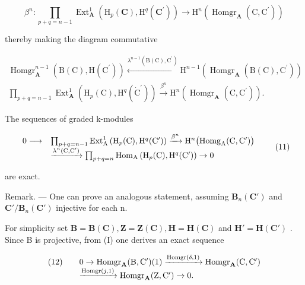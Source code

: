 \[
\beta^ {n}: \prod_ {p + q = n - 1} \operatorname{Ext} _ {\mathbf {A}} ^ {1} \left(\mathrm{H} _ {p} (\mathbf {C}), \mathrm{H} ^ {q} \left(\mathbf {C} ^ {\prime}\right)\right)\rightarrow \mathrm{H} ^ {n} \left(\operatorname{Homgr} _ {\mathbf {A}} \left(\mathrm{C}, \mathrm{C} ^ {\prime}\right)\right)
\]

thereby making the diagram commutative

\[
\begin{array}{c} \operatorname{Homgr} _ {\mathbf {A}} ^ {n - 1} (\mathrm{B} (\mathrm{C}), \mathrm{H} (\mathrm{C} ^ {\prime})) \xleftarrow {\lambda^ {n - 1} (\mathrm{B} (\mathrm{C}) , \mathrm{C} ^ {\prime})} \mathrm{H} ^ {n - 1} (\operatorname{Homgr} _ {\mathbf {A}} (\mathrm{B} (\mathrm{C}), \mathrm{C} ^ {\prime})) \\ \prod_ {p + q = n - 1} \operatorname{Ext} _ {\mathbf {A}} ^ {1} (\mathrm{H} _ {p} (\mathrm{C}), \mathrm{H} ^ {q} (\dot {\mathrm{C}} ^ {\prime})) \xrightarrow {\beta^ {n}} \mathrm{H} ^ {n} (\operatorname{Homgr} _ {\mathbf {A}} (\mathrm{C}, \mathrm{C} ^ {\prime})). \end{array}
\]

The sequences of graded k-modules

\[
\begin{array}{r l} 0 \longrightarrow & \prod_ {p + q = n - 1} \operatorname{Ext} _ {\mathrm{A}} ^ {1} \left(\mathrm{H} _ {p} (\mathrm{C}), \mathrm{H} ^ {q} (\mathrm{C} ^ {\prime})\right) \xrightarrow {\beta^ {n}} \mathrm{H} ^ {n} \big (\mathrm{Homg} _ {\mathrm{A}} (\mathrm{C}, \mathrm{C} ^ {\prime}) \big) \\ & \xrightarrow {\lambda^ {n} (\mathrm{C} , \mathrm{C} ^ {\prime})} \prod_ {p + q = n} \mathrm{Hom} _ {\mathrm{A}} \left(\mathrm{H} _ {p} (\mathrm{C}), \mathrm{H} ^ {q} (\mathrm{C} ^ {\prime})\right) \to 0 \end{array}\tag{11}
\]

are exact.

Remark. --- One can prove an analogous statement, assuming \(\mathbf{B}_{n}(\mathbf{C}')\) and \(\mathbf{C}'/\mathbf{B}_{n}(\mathbf{C}')\) injective for each n.

For simplicity set \(\mathbf{B} = \mathbf{B}(\mathbf{C}), \mathbf{Z} = \mathbf{Z}(\mathbf{C}), \mathbf{H} = \mathbf{H}(\mathbf{C})\) and \(\mathbf{H}' = \mathbf{H}(\mathbf{C}')\) . Since B is projective, from (I) one derives an exact sequence

\[
\begin{array}{r l}(1 2) \quad&0 \rightarrow \operatorname{Homgr} _ {\mathbf {A}} (\mathrm{B}, \mathrm{C} ^ {\prime}) (1) \xrightarrow {\operatorname{Homgr} (\delta , 1)} \operatorname{Homgr} _ {\mathbf {A}} (\mathrm{C}, \mathrm{C} ^ {\prime})\\&\xrightarrow {\operatorname{Homgr} (j , 1)} \operatorname{Homgr} _ {\mathbf {A}} (\mathrm{Z}, \mathrm{C} ^ {\prime}) \rightarrow 0.\end{array}
\]

